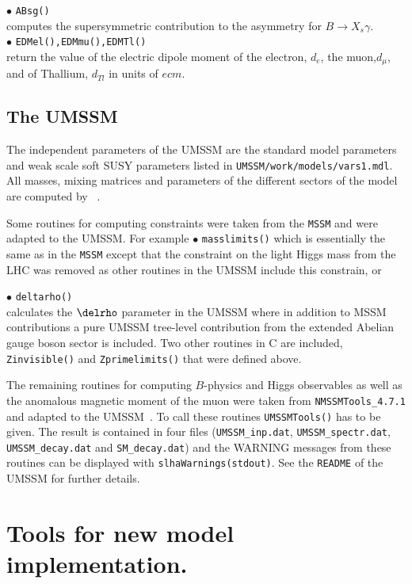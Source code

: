 \documentclass[12pt,a4paper]{article}
\begin{document}
{\noi$\bullet$ \verb|ABsg()|\\
computes the supersymmetric contribution to the asymmetry for  ${B}\rightarrow X_s\gamma$.\\ 


\noindent$\bullet$ \verb|EDMel(),EDMmu(),EDMTl()|\\
return the  value of the
electric dipole moment of the electron, $d_e$, the muon,$d_\mu$,   
and of Thallium, $d_{Tl}$ in units of $ecm$. 

\subsection{The UMSSM}

The independent parameters of the UMSSM are the standard model
parameters and weak scale soft SUSY parameters listed in \verb|UMSSM/work/models/vars1.mdl|.
All  masses, mixing matrices and parameters of the different sectors of the model
are computed by \micro~\cite{DaSilva:2013jga,Belanger:2015cra}.

Some routines for computing constraints were taken from the {\tt MSSM} and were adapted to the UMSSM. For example
 \noi$\bullet$ \verb|masslimits()|
which is essentially the same as in the {\tt MSSM} except that
the constraint on the light Higgs mass from the LHC was removed
as other routines in the UMSSM include this constrain, or

\noi$\bullet$ \verb|deltarho()|\\
 calculates  the $\delrho$ parameter in the UMSSM where in addition to MSSM contributions
a pure UMSSM tree-level contribution from the extended Abelian gauge boson sector is included.
Two other routines in C are included, \verb|Zinvisible()| and \verb|Zprimelimits()| that were defined above. 


The remaining routines for computing $B$-physics and Higgs observables as well as the anomalous magnetic moment of the muon
were taken from \verb|NMSSMTools_4.7.1| and adapted to the UMSSM~\cite{DaSilva:2013jga}.
To call these routines \verb|UMSSMTools()| has to be given. The result is contained in four files (\verb|UMSSM_inp.dat|,
\verb|UMSSM_spectr.dat|, \verb|UMSSM_decay.dat| and \verb|SM_decay.dat|) and the WARNING messages from these routines
can be displayed with \verb|slhaWarnings(stdout)|. See the \verb|README| of the UMSSM for further details.


\section{Tools for new model implementation.}


}
\end{document}
